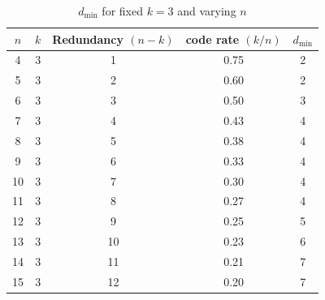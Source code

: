 \documentclass{article}
\begin{document}
\begin{table}[ht]
  \centering
  \begin{tabular}{ccccc}
    \hline
    \(n\)  &  \(k\)  &  Redundancy \((n - k)\)  & code rate \((k/n)\) & \(d_\text{min}\)\\
    \hline
         4  &  3  &   1  &  0.75  &  2 \\
         5  &  3  &   2  &  0.60  &  2 \\
         6  &  3  &   3  &  0.50  &  3 \\
         7  &  3  &   4  &  0.43  &  4 \\
         8  &  3  &   5  &  0.38  &  4 \\
         9  &  3  &   6  &  0.33  &  4 \\
        10  &  3  &   7  &  0.30  &  4 \\
        11  &  3  &   8  &  0.27  &  4 \\
        12  &  3  &   9  &  0.25  &  5 \\
        13  &  3  &  10  &  0.23  &  6 \\
        14  &  3  &  11  &  0.21  &  7 \\
        15  &  3  &  12  &  0.20  &  7 \\
    \hline
  \end{tabular}
  \caption{\(d_\text{min}\) for fixed \(k = 3\) and varying \(n\) \cite{jaish2026}}
  \label{tab:fixed_k}
\end{table}
\end{document}
